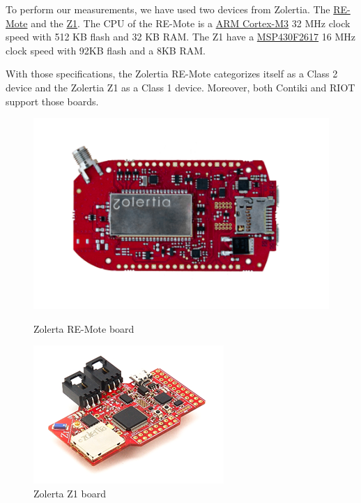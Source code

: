 To perform our measurements, we have used two devices from Zolertia.
The \href{https://github.com/Zolertia/Resources/wiki/RE-Mote}{RE-Mote} and the \href{https://github.com/Zolertia/Resources/wiki/The-Z1-mote}{Z1}.
The CPU of the RE-Mote is a \href{https://developer.arm.com/ip-products/processors/cortex-m/cortex-m3}{ARM Cortex-M3} 32 MHz clock speed with 512 KB flash and 32 KB RAM.
The Z1 have a \href{http://www.ti.com/product/MSP430F2617}{MSP430F2617} 16 MHz clock speed with 92KB flash and a 8KB RAM.

With those specifications, the Zolertia RE-Mote categorizes itself as a Class 2 device and the Zolertia Z1 as a Class 1 device.
Moreover, both Contiki and RIOT support those boards.

\begin{figure}[!ht]
    \begin{minipage}{.45\textwidth}
        \centering
        \includegraphics[scale=.5]{assets/remote.png}
        \caption{Zolerta RE-Mote board}
    \end{minipage}\hfill
    \begin{minipage}{.45\textwidth}        
        \centering
        \includegraphics[scale=2.5]{assets/z1.png}
        \caption{Zolerta Z1 board}
    \end{minipage}
\end{figure}

